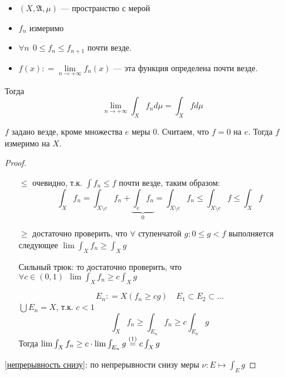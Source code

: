 \begin{theorem}[Леви]\itemfix
    \begin{itemize}
        \item \((X, \mathfrak{A}, \mu)\) --- пространство с мерой
        \item \(f_n\) измеримо
        \item \(\forall n \ \ 0 \leq f_n \leq f_{n+1}\) почти везде.
        \item \(f(x) : = \lim\limits_{n \to +\infty} f_n(x)\) --- эта функция определена почти везде.
    \end{itemize}

    Тогда \[\lim_{n \to +\infty} \int_X f_n d\mu = \int_X f d\mu\]
    \begin{remark}
        \(f\) задано везде, кроме множества \(e\) меры \(0\). Считаем, что \(f = 0\) на \(e\). Тогда \(f\) измеримо на \(X\).
    \end{remark}
\end{theorem}
\begin{proof}\itemfix
    \begin{itemize}
        \item [ \( \leq \)] очевидно, т.к. \(\int f_n \leq f\) почти везде, таким образом:
              \[\int_X f_n = \int_{X\setminus e} f_n + \underbrace{\int_e f_n}_0 = \int_{X\setminus e} f_n \leq \int_{X\setminus e} f \leq \int_{X} f\]
        \item [ \( \geq \)] достаточно проверить, что \(\forall \) ступенчатой \(g : 0 \leq g < f\) выполняется следующее \(\lim \int_X f_n \geq \int_X g\)

              Сильный трюк: то достаточно проверить, что \(\forall c\in(0, 1) \ \ \lim \int_X f_n \geq c \int_X g\)

              \[E_n : = X(f_n \geq cg) \quad E_1 \subset E_2 \subset \dots\]
              \(\bigcup E_n = X\), т.к. \(c < 1\)
              \[\int_X f_n \geq \int_{E_n} f_n \geq c \int_{E_n} g\]
              Тогда \(\lim \int_X f_n \geq c\cdot \lim \int_{E_n}g \symrefeq{непрерывность снизу} c\int_X g\)
    \end{itemize}

    \ref{непрерывность снизу}: по непрерывности снизу меры \(\nu : E \mapsto \int_E g\)
\end{proof}

